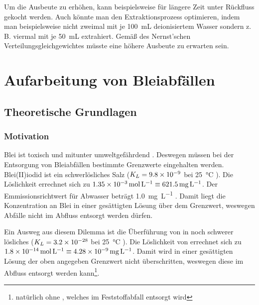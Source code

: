 \documentclass{article}
\begin{document}
      Um die Ausbeute zu erhöhen, kann beispielsweise für längere Zeit unter Rückfluss gekocht werden. Auch könnte man den Extraktionsprozess optimieren, indem man beispielsweise nicht zweimal mit je \SI[mode=text]{100}{\milli\liter} deionisiertem Wasser sondern z. B. viermal mit je \SI[mode=text]{50}{\milli\liter} extrahiert. Gemäß des Nernst'schen Verteilungsgleichgewichtes müsste eine höhere Ausbeute zu erwarten sein.
     
     \pagebreak
     
     \section{Aufarbeitung von Bleiabfällen}
     
       \subsection{Theoretische Grundlagen}
         
         \subsubsection{Motivation}
           
           Blei ist toxisch und mitunter umweltgefährdend \citep{blei}. Deswegen müssen bei der Entsorgung von Bleiabfällen bestimmte Grenzwerte eingehalten werden. Blei(II)iodid ist ein schwerlösliches Salz ($K_{L} = \num{9.8d-9}$ bei \SI[mode=text]{25}{\degreeCelsius} \cite{solubilityConstants}). Die Löslichkeit errechnet sich zu $\SI[mode=text]{1.35d-3}{\mole\per\liter} \equiv \SI[mode=text]{621.5}{\milli\gram\per\liter}$. Der Emmissionsrichtwert für Abwasser beträgt \SI[mode=text]{1.0}{\milli\gram\per\liter} \cite{Versuchsvorschrift}. Damit liegt die Konzentration an Blei in einer gesättigten  Lösung über dem Grenzwert, weswegen  Abfälle nicht im Abfluss entsorgt werden dürfen. 
           
           Ein Ausweg aus diesem Dilemma ist die Überführung von  in noch schwerer lösliches  ($K_{L} = \num{3.2d-28}$ bei \SI[mode=text]{25}{\degreeCelsius} \cite{solubilityPbS}). Die Löslichkeit von  errechnet sich zu $\SI[mode=text]{1.8d-14}{\mole\per\liter} \equiv \SI[mode=text]{4.28d-9}{\milli\gram\per\liter}$. Damit wird in einer gesättigten  Lösung der oben angegeben Grenzwert nicht überschritten, weswegen diese im Abfluss entsorgt werden kann\footnote{natürlich ohne , welches im Feststoffabfall entsorgt wird}.
           
\end{document}
